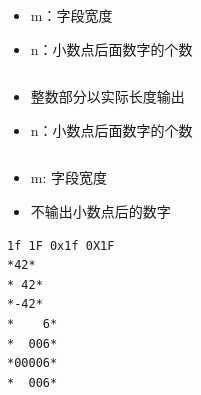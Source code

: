 \begin{frame}[fragile]
\begin{lstlisting}[backgroundcolor=\color{red!20}]
%m.nf     %m.ne      %m.nE
\end{lstlisting}

\begin{itemize}
\item m：字段宽度
\item n：小数点后面数字的个数
\end{itemize}
\end{frame}

\begin{frame}[fragile]
\begin{lstlisting}[backgroundcolor=\color{red!20}] 
%.nf
\end{lstlisting}

\begin{itemize}
\item  整数部分以实际长度输出
\item n：小数点后面数字的个数
\end{itemize}
\end{frame}

\begin{frame}[fragile]
\begin{lstlisting}[backgroundcolor=\color{red!20}] 
%m.f
\end{lstlisting}

\begin{itemize}
\item m: 字段宽度
\item 不输出小数点后的数字
\end{itemize}
\end{frame}

\begin{frame}[fragile]
        
\end{frame}

\begin{frame}[fragile]
\begin{lstlisting}[showspaces=true,backgroundcolor=\color{red!20}]
1f 1F 0x1f 0X1F
*42*
* 42*
*-42*
*    6*
*  006*
*00006*
*  006*
\end{lstlisting}
\end{frame}



